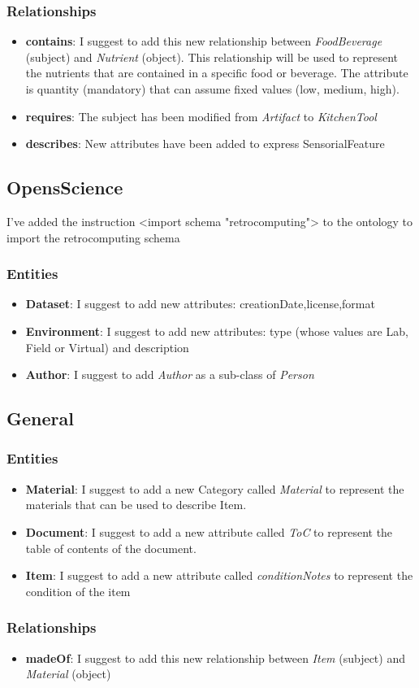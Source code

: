 \subsubsection{Relationships}
\begin{itemize}
    \item \textbf{contains}: I suggest to add this new relationship between \textit{FoodBeverage} (subject) and \textit{Nutrient} (object). This relationship will be used to represent the nutrients that are contained in a specific food or beverage. The attribute is quantity (mandatory) that can assume fixed values (low, medium, high).
    \item \textbf{requires}: The subject has been modified from \textit{Artifact} to \textit{KitchenTool}
    \item \textbf{describes}: New attributes have been added to express SensorialFeature 
\end{itemize}

\subsection{OpensScience}

I've added the instruction <import schema "retrocomputing"> to the ontology to import the retrocomputing schema

\subsubsection{Entities}
\begin{itemize}
    \item \textbf{Dataset}: I suggest to add new attributes: creationDate,license,format
    \item \textbf{Environment}: I suggest to add new attributes: type (whose values are Lab, Field or Virtual) and description
    \item \textbf{Author}: I suggest to add \textit{Author} as a sub-class of \textit{Person}
\end{itemize}

\subsection{General}
\subsubsection{Entities}
\begin{itemize}
    \item \textbf{Material}: I suggest to add a new Category called \textit{Material} to represent the materials that can be used to describe Item.
    \item \textbf{Document}: I suggest to add a new attribute called \textit{ToC} to represent the table of contents of the document.
    \item \textbf{Item}: I suggest to add a new attribute called \textit{conditionNotes} to represent the condition of the item
\end{itemize}
\subsubsection{Relationships}
\begin{itemize}
    \item \textbf{madeOf}: I suggest to add this new relationship between \textit{Item} (subject) and \textit{Material} (object)
\end{itemize}
